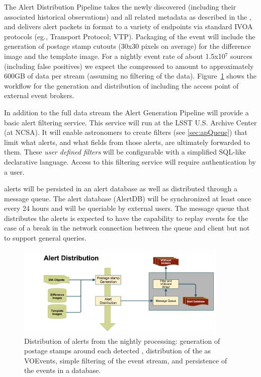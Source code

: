 The Alert Distribution Pipeline takes the newly discovered \DIAObjects (including their associated historical observations) and all related metadata as described in the \DPDD, and delivers alert packets in \VOEvent format to a variety of endpoints via standard IVOA protocols (eg., \VOEvent Transport Protocol; VTP\@). Packaging of the event will include the generation of postage stamp cutouts (30x30 pixels on average) for the difference image and the template image. For a nightly event rate of about 1.5x10$^7$ sources (including false positives) we expect the compressed \VOEvents to amount to approximately 600GB of data per stream (assuming no filtering of the data).  Figure~\ref{fig:apAlertDistribution} shows the workflow for the generation and distribution of \VOEvents including the access point of external event brokers.

In addition to the full data stream the Alert Generation Pipeline will provide a basic alert filtering service. This service will run at the LSST U.S. Archive Center (at NCSA). It will enable astronomers to create filters (see  \ref{sec:apQueue}) that limit what alerts, and what fields from those alerts, are ultimately forwarded to them. These \emph{user defined filters} will be configurable with a simplified SQL-like declarative language. Access to this filtering service will require authentication by a user. 

\VOEvent alerts will be persisted in an alert database as well as distributed through a message queue. The alert database (AlertDB) will be synchronized at least once every 24 hours and will be queriable by external users. The message queue that distributes the alerts is expected to have the capability  to replay events for the case of a break in the network connection between the queue and client but not to support general queries.

\begin{figure}[th]
\begin{center}
\includegraphics[width=0.9\textwidth]{figures/Alert_Distribution.png}
\caption{\label{fig:apAlertDistribution} Distribution of alerts from the nightly processing: generation of postage stamps around each detected \DIASource, distribution of the \DIAObjects as VOEvents, simple filtering of the event stream, and persistence of the events in a database.}
\end{center}
\end{figure} 

